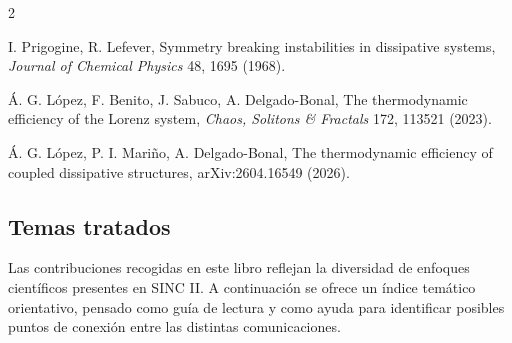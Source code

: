 \documentclass[11pt,a4paper]{article}
\begin{document}
\begin{sincabstract}
\vspace{-0.6em}


\vspace{-0.4em}

\begin{multicols}{2}

{\small
\begin{enumerate}[label={[\arabic*]},leftmargin=*,itemsep=0.15em,topsep=0.2em]
\item I. Prigogine, R. Lefever, Symmetry breaking instabilities in dissipative systems, \textit{Journal of Chemical Physics} 48, 1695 (1968).

\item Á. G. López, F. Benito, J. Sabuco, A. Delgado-Bonal, The thermodynamic efficiency of the Lorenz system, \textit{Chaos, Solitons \& Fractals} 172, 113521 (2023).

\item Á. G. López, P. I. Mariño, A. Delgado-Bonal, The thermodynamic efficiency of coupled dissipative structures, arXiv:2604.16549 (2026).
\end{enumerate}
}
\end{multicols}
\end{sincabstract}

\clearpage
{}
\label{sec:temas}
\begin{center}
\section*{\Huge Temas tratados}
\end{center}
\vspace{0.8em}

Las contribuciones recogidas en este libro reflejan la diversidad de enfoques científicos presentes en SINC II. A continuación se ofrece un índice temático orientativo, pensado como guía de lectura y como ayuda para identificar posibles puntos de conexión entre las distintas comunicaciones.
\end{document}
